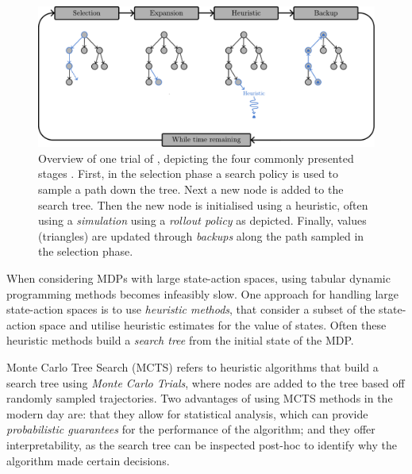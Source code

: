     \begin{figure}
        \centering\includegraphics[width=1.0\textwidth]{figures/ch2/mcts_trial.pdf} 
        \caption[Overview of one trial of \mctsone.]{Overview of one trial of \mctsone, depicting the four commonly presented stages \cite{mcts_survey}. First, in the selection phase a search policy is used to sample a path down the tree. Next a new node is added to the search tree. Then the new node is initialised using a heuristic, often using a \textit{simulation} using a \textit{rollout policy} as depicted. Finally, values (triangles) are updated through \textit{backups} along the path sampled in the selection phase.}
        \label{fig:2:mcts}
    \end{figure}

    When considering MDPs with large state-action spaces, using tabular dynamic programming methods becomes infeasibly slow. One approach for handling large state-action spaces is to use \textit{heuristic methods}, that consider a subset of the state-action space and utilise heuristic estimates for the value of states. Often these heuristic methods build a \textit{search tree} from the initial state of the MDP.

    Monte Carlo Tree Search (MCTS) refers to heuristic algorithms that build a search tree using \textit{Monte Carlo Trials}, where nodes are added to the tree based off randomly sampled trajectories. Two advantages of using MCTS methods in the modern day are: that they allow for statistical analysis, which can provide \textit{probabilistic guarantees} for the performance of the algorithm; and they offer interpretability, as the search tree can be inspected post-hoc to identify why the algorithm made certain decisions. 

